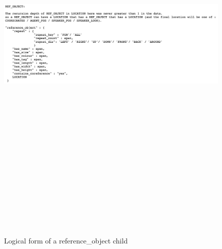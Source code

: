\begin{figure}[h]
    \centering
    \includegraphics[width=15cm,height=20cm,keepaspectratio]{figures/ref_obj.png}
    \caption{Logical form of a reference\_object child}
    \label{fig:ref_obj}
\end{figure}


